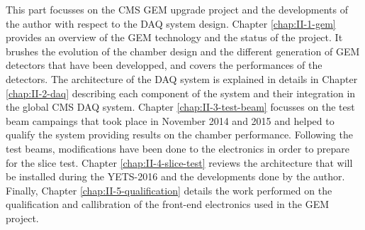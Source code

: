 This part focusses on the CMS GEM upgrade project and the developments of the author with respect to the DAQ system design. Chapter \ref{chap:II-1-gem} provides an overview of the GEM technology and the status of the project. It brushes the evolution of the chamber design and the different generation of GEM detectors that have been developped, and covers the performances of the detectors. The architecture of the DAQ system is explained in details in Chapter \ref{chap:II-2-daq} describing each component of the system and their integration in the global CMS DAQ system. Chapter \ref{chap:II-3-test-beam} focusses on the test beam campaings that took place in November 2014 and 2015 and helped to qualify the system providing results on the chamber performance. Following the test beams, modifications have been done to the electronics in order to prepare for the slice test. Chapter \ref{chap:II-4-slice-test} reviews the architecture that will be installed during the YETS-2016 and the developments done by the author. Finally, Chapter \ref{chap:II-5-qualification} details the work performed on the qualification and callibration of the front-end electronics used in the GEM project.
